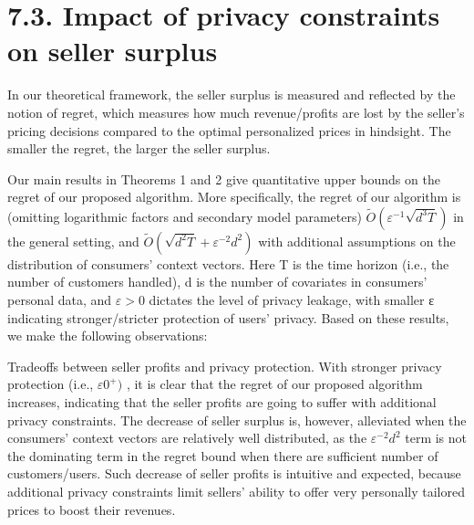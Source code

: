 \section{7.3. Impact of privacy constraints on seller surplus}\label{impact-of-privacy-constraints-on-seller-surplus}

In our theoretical framework, the seller surplus is measured and reflected by the notion of regret, which measures how much revenue/profits are lost by the seller's pricing decisions compared to the optimal personalized prices in hindsight. The smaller the regret, the larger the seller surplus.

Our main results in Theorems 1 and 2 give quantitative upper bounds on the regret of our proposed algorithm. More specifically, the regret of our algorithm is (omitting logarithmic factors and secondary model parameters) \(\widetilde { O } ( \varepsilon ^ { - 1 } \sqrt { d ^ { 3 } T } )\) in the general setting, and \(\widetilde { O } ( \sqrt { d ^ { 2 } T } + \varepsilon ^ { - 2 } d ^ { 2 } )\) with additional assumptions on the distribution of consumers' context vectors. Here T is the time horizon (i.e., the number of customers handled), d is the number of covariates in consumers' personal data, and \(\varepsilon > 0\) dictates the level of privacy leakage, with smaller ε indicating stronger/stricter protection of users' privacy. Based on these results, we make the following observations:

Tradeoffs between seller profits and privacy protection. With stronger privacy protection (i.e., \(\varepsilon  0 ^ { + } )\) , it is clear that the regret of our proposed algorithm increases, indicating that the seller profits are going to suffer with additional privacy constraints. The decrease of seller surplus is, however, alleviated when the consumers' context vectors are relatively well distributed, as the \(\varepsilon ^ { - 2 } d ^ { 2 }\) term is not the dominating term in the regret bound when there are sufficient number of customers/users. Such decrease of seller profits is intuitive and expected, because additional privacy constraints limit sellers' ability to offer very personally tailored prices to boost their revenues.

